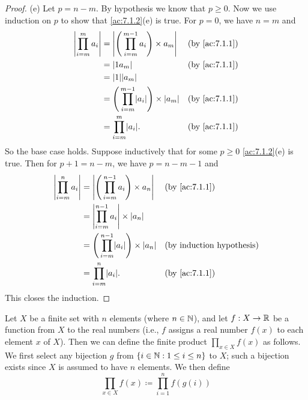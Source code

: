 \begin{proof}{(e)}
  Let \(p = n - m\).
  By hypothesis we know that \(p \geq 0\).
  Now we use induction on \(p\) to show that \cref{ac:7.1.2}(e) is true.
  For \(p = 0\), we have \(n = m\) and
  \begin{align*}
    \abs{\prod_{i = m}^m a_i} & = \abs{\Bigg(\prod_{i = m}^{m - 1} a_i\Bigg) \times a_m}       &  & \by{ac:7.1.1} \\
                              & = \abs{1a_m}                                                   &  & \by{ac:7.1.1} \\
                              & = \abs{1}\abs{a_m}                                                                \\
                              & = \Bigg(\prod_{i = m}^{m - 1} \abs{a_i}\Bigg) \times \abs{a_m} &  & \by{ac:7.1.1} \\
                              & = \prod_{i = m}^m \abs{a_i}.                                   &  & \by{ac:7.1.1}
  \end{align*}
  So the base case holds.
  Suppose inductively that for some \(p \geq 0\) \cref{ac:7.1.2}(e) is true.
  Then for \(p + 1 = n - m\), we have \(p = n - m - 1\) and
  \begin{align*}
    \abs{\prod_{i = m}^n a_i} & = \abs{\Bigg(\prod_{i = m}^{n - 1} a_i\Bigg) \times a_n}       &  & \by{ac:7.1.1} \\
                              & = \abs{\prod_{i = m}^{n - 1} a_i} \times \abs{a_n}                                \\
                              & = \Bigg(\prod_{i = m}^{n - 1} \abs{a_i}\Bigg) \times \abs{a_n} &  & \byIH         \\
                              & = \prod_{i = m}^n \abs{a_i}.                                   &  & \by{ac:7.1.1}
  \end{align*}
  This closes the induction.
\end{proof}

\begin{ac}\label{ac:7.1.3}
  Let \(X\) be a finite set with \(n\) elements (where \(n \in \mathbb{N}\)), and let \(f : X \to \mathbb{R}\) be a function from \(X\) to the real numbers
  (i.e., \(f\) assigns a real number \(f(x)\) to each element \(x\) of \(X\)).
  Then we can define the finite product \(\prod_{x \in X} f(x)\) as follows.
  We first select any bijection \(g\) from \(\left\lbrace i \in \mathbb{N} : 1 \leq i \leq n\right\rbrace\) to \(X\);
  such a bijection exists since \(X\) is assumed to have \(n\) elements.
  We then define
  \[
    \prod_{x \in X} f(x) \coloneqq \prod_{i = 1}^n f(g(i))
  \]
\end{ac}

